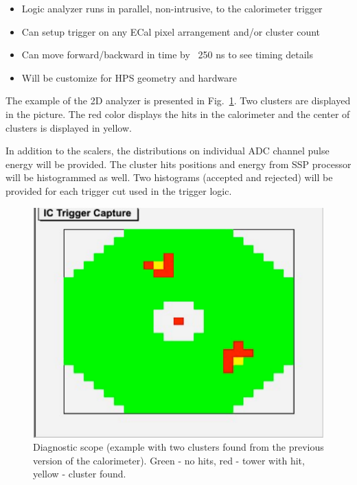 \begin{itemize}
\item Logic analyzer runs in parallel, non-intrusive, to the calorimeter trigger
\item Can setup trigger on any ECal pixel arrangement and/or cluster count
\item Can move forward/backward in time by ~250 ns to see timing details
\item Will be customize for HPS geometry and hardware
\end{itemize}

The example of the 2D analyzer is presented in Fig.~\ref{fig:dvcs_2_cluster}. Two clusters are displayed
in the picture. The red color displays the hits in the calorimeter and  the center of clusters is displayed in yellow.

In addition to the scalers, the distributions on individual ADC channel pulse energy will be provided.
The cluster hits positions and energy from SSP processor will be histogrammed as well. Two histograms (accepted and rejected) will be provided for each trigger cut used in the trigger logic.



\begin{figure}[t]
\includegraphics[scale=0.8]{daq_trigger/figures/dvcs_2_cluster}
\caption{\small{Diagnostic scope (example with two clusters found from the previous version of the calorimeter). Green - no hits, red - tower with hit, yellow - cluster found.}}
\label{fig:dvcs_2_cluster}
\end{figure}


